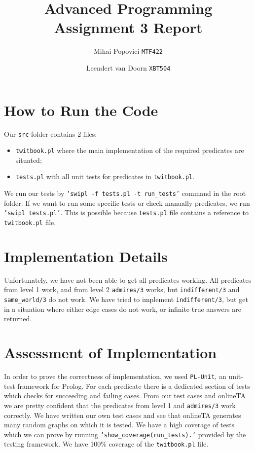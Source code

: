 \documentclass{article}
\title{Advanced Programming Assignment 3 Report}
\author{Mihai Popovici \texttt{MTF422} \and Leendert van Doorn \texttt{XBT504}}
\begin{document}
\maketitle

\section{How to Run the Code}
Our \texttt{src} folder contains 2 files:
\begin{itemize}
	\item \texttt{twitbook.pl} where the main implementation of the required predicates are situated;
	\item \texttt{tests.pl} with all unit tests for predicates in \texttt{twitbook.pl}.  
\end{itemize} 
We run our tests by \texttt{'swipl -f tests.pl -t run\_tests'} command in the root folder.
If we want to run some specific tests or check manually predicates, we run \texttt{'swipl tests.pl'}. This is possible because \texttt{tests.pl} file contains a reference to \texttt{twitbook.pl} file.

\section{Implementation Details}
Unfortunately, we have not been able to get all predicates working. All predicates from level 1 work, and from level 2 \texttt{admires/3} works, but \texttt{indifferent/3} and \texttt{same\_world/3} do not work. We have tried to implement \texttt{indifferent/3}, but get in a situation where either edge cases do not work, or infinite true answers are returned. 

\section{Assessment of Implementation}
In order to prove the correctness of implementation, we used \texttt{PL-Unit}, an unit-test framework for Prolog. For each predicate there is a dedicated section of tests which checks for succeeding and failing cases.
From our test cases and onlineTA we are pretty confident that the predicates from level 1 and \texttt{admires/3} work correctly. We have written our own test cases and see that onlineTA generates many random graphs on which it is tested.
We have a high coverage of tests which we can prove by running \texttt{'show\_coverage(run\_tests).'} provided by the testing framework. We have 100\% coverage of the \texttt{twitbook.pl} file.
\end{document}
